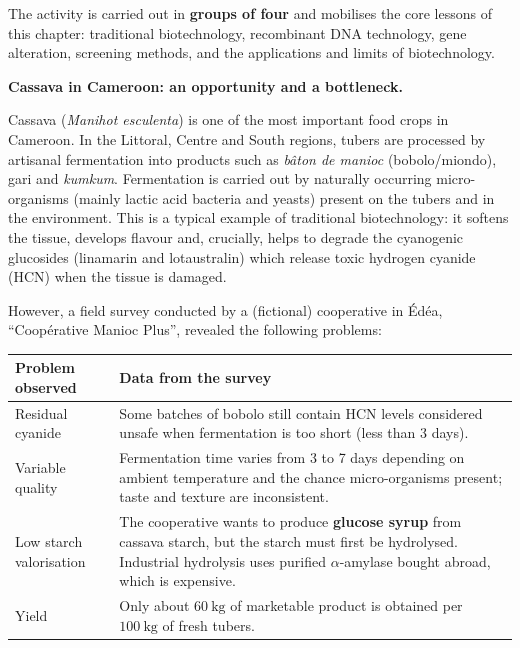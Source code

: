 \documentclass[11pt]{article}
\newcommand{\cle}[1]{{\popxbold\color{popdark}#1}}
\newcounter{popsec}
\newcounter{popsub}
\newcommand{\courssub}[1]{%
  \stepcounter{popsub}%
  \par\vspace{9pt}\noindent{\popxbold\fontsize{11.5}{13}\selectfont\color{popink}{\color{poporange}\thepopsec.\thepopsub}\hspace{6pt}#1}\par\nopagebreak\vspace{4pt}
}
\begin{document}
The activity is carried out in \textbf{groups of four} and mobilises the core lessons of this chapter: traditional biotechnology, recombinant DNA technology, gene alteration, screening methods, and the applications and limits of biotechnology.

\courssub{Situation}

\textbf{Cassava in Cameroon: an opportunity and a bottleneck.}\par
Cassava (\emph{Manihot esculenta}) is one of the most important food crops in Cameroon. In the Littoral, Centre and South regions, tubers are processed by artisanal fermentation into products such as \emph{bâton de manioc} (bobolo/miondo), gari and \emph{kumkum}. Fermentation is carried out by naturally occurring micro-organisms (mainly lactic acid bacteria and yeasts) present on the tubers and in the environment. This is a typical example of \cle{traditional biotechnology}: it softens the tissue, develops flavour and, crucially, helps to degrade the \cle{cyanogenic glucosides} (linamarin and lotaustralin) which release toxic hydrogen cyanide (HCN) when the tissue is damaged.

However, a field survey conducted by a (fictional) cooperative in Édéa, ``Coopérative Manioc Plus'', revealed the following problems:

\begin{center}
\begin{tabularx}{\linewidth}{|l|X|}\hline
\rowcolor{popblueL} \textbf{Problem observed} & \textbf{Data from the survey} \\ \hline
Residual cyanide & Some batches of bobolo still contain HCN levels considered unsafe when fermentation is too short (less than 3 days). \\ \hline
Variable quality & Fermentation time varies from 3 to 7 days depending on ambient temperature and the chance micro-organisms present; taste and texture are inconsistent. \\ \hline
Low starch valorisation & The cooperative wants to produce \textbf{glucose syrup} from cassava starch, but the starch must first be hydrolysed. Industrial hydrolysis uses purified $\alpha$-amylase bought abroad, which is expensive. \\ \hline
Yield & Only about $60\ \mathrm{kg}$ of marketable product is obtained per $100\ \mathrm{kg}$ of fresh tubers. \\ \hline
\end{tabularx}
\end{center}
\end{document}

